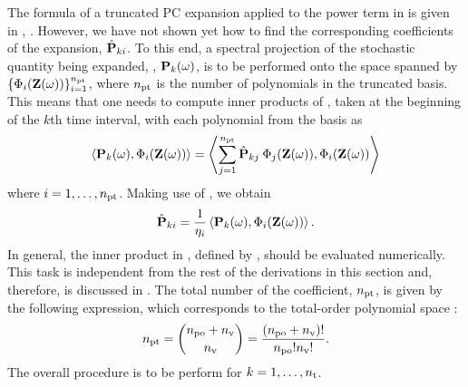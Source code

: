 The formula of a truncated PC expansion applied to the power term in  is given in , . However, we have not shown yet how to find the corresponding coefficients of the expansion, $\hat{\mathbf{P}}_{ki}$. To this end, a spectral projection of the stochastic quantity being expanded, \ie, $\mathbf{P}_k(\omega)$, is to be performed onto the space spanned by $\{ \Phi_i(\mathbf{Z}(\omega)) \}_{i = 1}^{{n_\text{pt}}}$, where ${n_\text{pt}}$ is the number of polynomials in the truncated basis. This means that one needs to compute inner products of , taken at the beginning of the $k$th time interval, with each polynomial from the basis as
\[
  \oInner{\vP_k(\o)}{\pcb_i(\vZ(\o))} = \oInner{\sum_{j=1}^{\pcterms} \pcc{\vP}_{kj} \: \pcb_j(\vZ(\o))}{\pcb_i(\vZ(\o))}
\]
where $i = 1, \dotsc, {n_\text{pt}}$. Making use of , we obtain
\begin{equation} \elabel{pc-coefficients}
  \pcc{\vP}_{ki} = \frac{1}{\pcn_i} \oInner{\vP_k(\o)}{\pcb_i(\vZ(\o))}.
\end{equation}
In general, the inner product in , defined by , should be evaluated numerically. This task is independent from the rest of the derivations in this section and, therefore, is discussed in . The total number of the coefficient, ${n_\text{pt}}$, is given by the following expression, which corresponds to the total-order polynomial space \cite{beck2011}:
\begin{equation} \elabel{pc-terms}
  \pcterms = { \pcorder + \nvars \choose \nvars } = \frac{(\pcorder + \nvars)!}{\pcorder! \nvars!}.
\end{equation}
The overall procedure is to be perform for $k = 1, \dotsc, {n_\text{t}}$.

